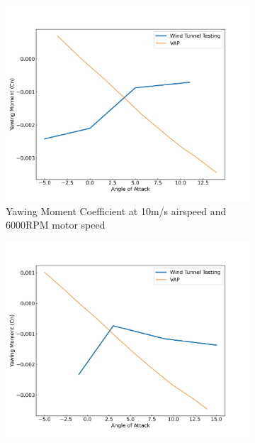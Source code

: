 \begin{figure}[H]
    \centering
    \begin{subfigure}[b]{0.467\textwidth}
        \centering
        \includegraphics[width=\textwidth]{05_Results/VAP/noProp/Cn/10ms_6000RPM_Cn.png}
        \caption{Yawing Moment Coefficient at 10m/s airspeed and 6000RPM motor speed}
        \label{fig:VAP_noProp_Cm_10ms_6000}
    \end{subfigure}
    \begin{subfigure}[b]{0.467\textwidth}
        \centering
        \includegraphics[width=\textwidth]{05_Results/VAP/noProp/Cn/10ms_11000RPM_Cn.png}

\end{subfigure}
\end{figure}
